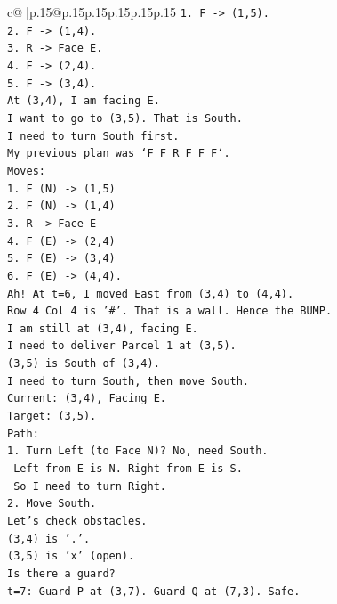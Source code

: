 \documentclass{article}
\begin{document}
{\begin{supertabular}{c@{$\;$}|p{.15\linewidth}@{}p{.15\linewidth}p{.15\linewidth}p{.15\linewidth}p{.15\linewidth}p{.15\linewidth}}
{{{\texttt{1. F {-}> (1,5).} \\
\texttt{2. F {-}> (1,4).} \\
\texttt{3. R {-}> Face E.} \\
\texttt{4. F {-}> (2,4).} \\
\texttt{5. F {-}> (3,4).} \\
\texttt{At (3,4), I am facing E.} \\
\texttt{I want to go to (3,5). That is South.} \\
\texttt{I need to turn South first.} \\
\texttt{My previous plan was `F F R F F F`.} \\
\texttt{Moves:} \\
\texttt{1. F (N) {-}> (1,5)} \\
\texttt{2. F (N) {-}> (1,4)} \\
\texttt{3. R {-}> Face E} \\
\texttt{4. F (E) {-}> (2,4)} \\
\texttt{5. F (E) {-}> (3,4)} \\
\texttt{6. F (E) {-}> (4,4).} \\
\texttt{Ah! At t=6, I moved East from (3,4) to (4,4).} \\
\texttt{Row 4 Col 4 is '\#'. That is a wall. Hence the BUMP.} \\
\texttt{I am still at (3,4), facing E.} \\
\texttt{I need to deliver Parcel 1 at (3,5).} \\
\texttt{(3,5) is South of (3,4).} \\
\texttt{I need to turn South, then move South.} \\
\texttt{Current: (3,4), Facing E.} \\
\texttt{Target: (3,5).} \\
\texttt{Path:} \\
\texttt{1. Turn Left (to Face N)? No, need South.} \\
\texttt{   Left from E is N. Right from E is S.} \\
\texttt{   So I need to turn Right.} \\
\texttt{2. Move South.} \\
\texttt{Let's check obstacles.} \\
\texttt{(3,4) is '.'.} \\
\texttt{(3,5) is 'x' (open).} \\
\texttt{Is there a guard?} \\
\texttt{t=7: Guard P at (3,7). Guard Q at (7,3). Safe.} \\
}}}
\end{supertabular}}
\end{document}
